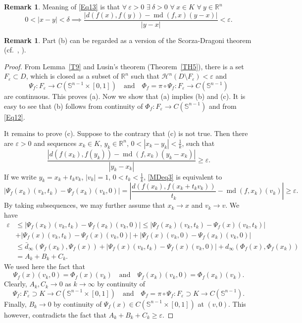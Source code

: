 \documentclass[12pt,leqno]{amsart}
\theoremstyle{definition}
\newtheorem{remark}[theorem]{Remark}
\newcommand{\bbbr}{\mathbb R}
\newcommand{\Sph}{\mathbb S}
\newcommand{\eps}{\varepsilon}
\def\H{{\mathcal H}}
\def\md{\operatorname{md}}
\numberwithin{theorem}{section} \numberwithin{equation}{section}
\begin{document}
\begin{remark}
Meaning of \eqref{Eq13} is that
$\forall\ \eps>0$  $\exists\  \delta>0$ $\forall \  x\in K$ $\forall \ y\in\bbbr^n$
$$
0<|x-y|<\delta \implies \frac{|d(f(x),f(y))-\md(f,x)(y-x)|}{|y-x|}<\eps.
$$
\end{remark}
\begin{remark}
Part (b)  can be regarded as a version of the Scorza-Dragoni theorem (cf.\ \cite[Theorem~3.8]{dacorogna}, \cite[Theorem~6.35]{FL}).
\end{remark}
\begin{proof}
From Lemma~\ref{T9} and Lusin's theorem (Theorem~\ref{TH5}), there is a set $F_\eps\subset D$,
which is closed as a subset of $\bbbr^n$ such that
$\H^n(D\setminus F_\eps)<\eps$ and
$$
\Psi_f:F_\eps\to C(\Sph^{n-1}\times [0,1])
\quad
\text{and}
\quad
\Phi_f=\pi\circ\Psi_f:F_\eps\to C(\Sph^{n-1})
$$
are continuous. This proves (a). Now we show that (a) implies (b) and (c).
It is easy to see that (b) follows from continuity of $\Phi_f:F_\eps\to C(\Sph^{n-1})$ and from \eqref{Eq12}.

It remains to prove (c). Suppose to the contrary that (c) is not true. Then there are $\eps>0$ and sequences $x_k\in K$, $y_k\in\bbbr^n$, $0<|x_k-y_k|<\frac{1}{k}$, such that
\begin{equation}
\label{MDeq3}
\frac{|d(f(x_k),f(y_k))-\md(f,x_k)(y_k-x_k)|}{|y_k-x_k|}\geq\eps.
\end{equation}
If we write $y_k=x_k+t_kv_k$, $|v_k|=1$, $0<t_k<\frac{1}{k}$, \eqref{MDeq3} is equivalent to
$$
|\Psi_f(x_k)(v_k,t_k)-\Psi_f(x_k)(v_k,0)|=\left|\frac{d(f(x_k),f(x_k+t_kv_k))}{t_k}-\md(f,x_k)(v_k)\right|\geq \eps.
$$
By taking subsequences, we may further assume that $x_k\to x$ and $v_k\to v$. We have
\begin{equation*}
\begin{split}
\eps
&\leq
|\Psi_f(x_k)(v_k,t_k)-\Psi_f(x_k)(v_k,0)| \leq
|\Psi_f(x_k)(v_k,t_k)-\Psi_f(x)(v_k,t_k)|\\
&+
|\Psi_f(x)(v_k,t_k)-\Psi_f(x)(v_k,0)|
+
|\Psi_f(x)(v_k,0)-\Psi_f(x_k)(v_k,0)|\\
&\leq
\bar{d}_\infty (\Psi_f(x_k),\Psi_f(x))+
|\Psi_f(x)(v_k,t_k)-\Psi_f(x)(v_k,0)|+
d_\infty(\Phi_f(x),\Phi_f(x_k))\\
&=
A_k+B_k+C_k.
\end{split}
\end{equation*}
We used here the fact that
$$
\Psi_f(x)(v_k,0)=\Phi_f(x)(v_k)
\quad
\text{and}
\quad
\Psi_f(x_k)(v_k,0)=\Phi_f(x_k)(v_k).
$$
Clearly, $A_k,C_k\to 0$ as $k\to\infty$ by continuity of
$$
\Psi_f:F_\eps\supset K\to C(\Sph^{n-1}\times [0,1])
\quad
\text{and}
\quad
\Phi_f=\pi\circ\Psi_f:F_\eps\supset K\to C(\Sph^{n-1}).
$$
Finally, $B_k\to 0$ by continuity of
$\Psi_f(x)\in C(\Sph^{n-1}\times [0,1])$ at $(v,0)$. This however, contradicts the fact that
$A_k+B_k+C_k\geq\eps$.
\end{proof}
\end{document}
